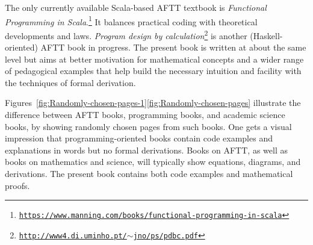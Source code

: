 The only currently available Scala-based AFTT textbook is \emph{Functional
Programming in Scala}.\footnote{\texttt{\href{https://www.manning.com/books/functional-programming-in-scala}{https://www.manning.com/books/functional-programming-in-scala}}}
It balances practical coding with theoretical developments and laws.
\emph{Program design by calculation}\footnote{\texttt{\href{http://www4.di.uminho.pt/~jno/ps/pdbc.pdf}{http://www4.di.uminho.pt/$\sim$jno/ps/pdbc.pdf}}}
is another (Haskell-oriented) AFTT book in progress. The present book
is written at about the same level but aims at better motivation for
mathematical concepts and a wider range of pedagogical examples that
help build the necessary intuition and facility with the techniques
of formal derivation. 

Figures~\ref{fig:Randomly-chosen-pages-1}\textendash \ref{fig:Randomly-chosen-pages}
illustrate the difference between AFTT books, programming books, and
academic science books, by showing randomly chosen pages from such
books. One gets a visual impression that programming-oriented books
contain code examples and explanations in words but no formal derivations.
Books on AFTT, as well as books on mathematics and science, will typically
show equations, diagrams, and derivations. The present book contains
both code examples and mathematical proofs.

